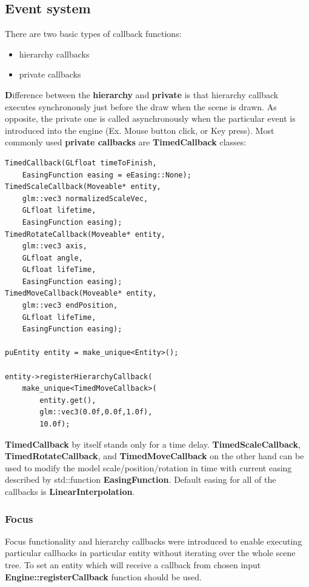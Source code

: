 \documentclass{article}
\begin{document}
\newpage
\subsection{Event system}\label{sec:Event system}
\indent \indent There are two basic types of callback functions:
\begin{itemize}
\item hierarchy callbacks
\item private callbacks
\end{itemize}

\indent \indent \textbf Difference between the \textbf{hierarchy} and \textbf{private} is that hierarchy callback executes synchronously just before the draw when the scene is drawn. As opposite, the private one is called asynchronously when the particular event is introduced into the engine (Ex. Mouse button click, or Key press). Most commonly used \textbf{private callbacks} are \textbf{TimedCallback} classes:

\begin{lstlisting}
TimedCallback(GLfloat timeToFinish,
	EasingFunction easing = eEasing::None);
TimedScaleCallback(Moveable* entity,
	glm::vec3 normalizedScaleVec,
	GLfloat lifetime,
	EasingFunction easing);
TimedRotateCallback(Moveable* entity,
	glm::vec3 axis,
	GLfloat angle,
	GLfloat lifeTime,
	EasingFunction easing);
TimedMoveCallback(Moveable* entity,
	glm::vec3 endPosition,
	GLfloat lifeTime,
	EasingFunction easing);
                  
puEntity entity = make_unique<Entity>();

entity->registerHierarchyCallback(
	make_unique<TimedMoveCallback>(
		entity.get(),
		glm::vec3(0.0f,0.0f,1.0f),
		10.0f);
\end{lstlisting}

\indent \indent \textbf{TimedCallback} by itself stands only for a time delay. \textbf{TimedScaleCallback}, \textbf{TimedRotateCallback}, and \textbf{TimedMoveCallback} on the other hand can be used to modify the model scale/position/rotation in time with current easing described by std::function \textbf{EasingFunction}. Default easing for all of the callbacks is \textbf{LinearInterpolation}.
\newpage

\subsubsection{Focus}\label{sec:Focus}
\indent \indent Focus functionality and hierarchy callbacks were introduced to enable executing particular callbacks in particular entity without iterating over the whole scene tree. To set an entity which will receive a callback from chosen input \textbf{Engine::registerCallback} function should be used.
\newline
\end{document}
